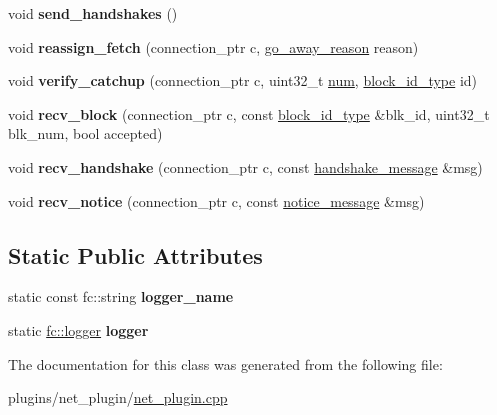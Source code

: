 \begin{DoxyCompactItemize}
\mbox{\label{classaacio_1_1sync__manager_aedc70b71c0faff032a7217443b3b9996}} 
void {\bfseries send\+\_\+handshakes} ()
\item 
\mbox{\label{classaacio_1_1sync__manager_a3a353340b10e47ad071d7802c3c431f1}} 
void {\bfseries reassign\+\_\+fetch} (connection\+\_\+ptr c, \mbox{\hyperlink{plugins_2net__plugin_2include_2aacio_2net__plugin_2protocol_8hpp_a1b8490273cc36ec0241920722ba18ab4}{go\+\_\+away\+\_\+reason}} reason)
\item 
\mbox{\label{classaacio_1_1sync__manager_a4e1711ff67f42434ac05e5309bf68a92}} 
void {\bfseries verify\+\_\+catchup} (connection\+\_\+ptr c, uint32\+\_\+t \mbox{\hyperlink{structnum}{num}}, \mbox{\hyperlink{classfc_1_1sha256}{block\+\_\+id\+\_\+type}} id)
\item 
\mbox{\label{classaacio_1_1sync__manager_abc9c6325b16c5f0e8ff16a4c6a2eccd1}} 
void {\bfseries recv\+\_\+block} (connection\+\_\+ptr c, const \mbox{\hyperlink{classfc_1_1sha256}{block\+\_\+id\+\_\+type}} \&blk\+\_\+id, uint32\+\_\+t blk\+\_\+num, bool accepted)
\item 
\mbox{\label{classaacio_1_1sync__manager_aa98f9ef3c02302b916e87fb52c2b6bf8}} 
void {\bfseries recv\+\_\+handshake} (connection\+\_\+ptr c, const \mbox{\hyperlink{structaacio_1_1handshake__message}{handshake\+\_\+message}} \&msg)
\item 
\mbox{\label{classaacio_1_1sync__manager_a61b5c9ffaf4c8ef99a30b5e29fe47433}} 
void {\bfseries recv\+\_\+notice} (connection\+\_\+ptr c, const \mbox{\hyperlink{structaacio_1_1notice__message}{notice\+\_\+message}} \&msg)
\end{DoxyCompactItemize}
\subsection*{Static Public Attributes}
\begin{DoxyCompactItemize}
\item 
\mbox{\label{classaacio_1_1sync__manager_ae82ed7e8dc081cea39ac845010a11340}} 
static const fc\+::string {\bfseries logger\+\_\+name}
\item 
\mbox{\label{classaacio_1_1sync__manager_a1a3b2b430aecd4a0638d7e4838ff51c9}} 
static \mbox{\hyperlink{classfc_1_1logger}{fc\+::logger}} {\bfseries logger}
\end{DoxyCompactItemize}


The documentation for this class was generated from the following file\+:\begin{DoxyCompactItemize}
\item 
plugins/net\+\_\+plugin/\mbox{\hyperlink{net__plugin_8cpp}{net\+\_\+plugin.\+cpp}}\end{DoxyCompactItemize}
